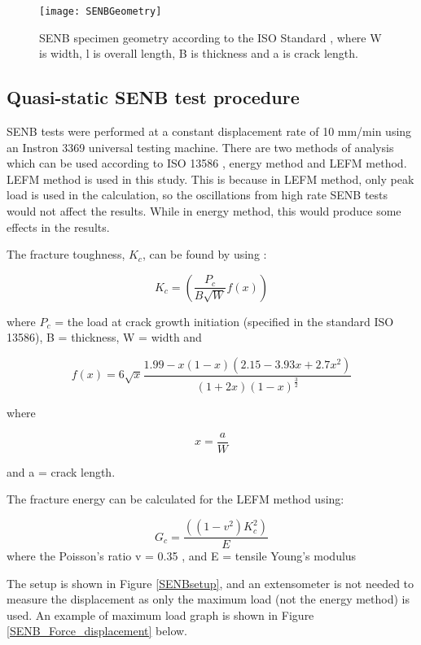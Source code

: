 \documentclass[numbers=noendperiod,chapterprefix=on]{icldt} %
\begin{document}
\begin{figure}[!hp]
\centering
\texttt{[image: SENBGeometry]}
\caption{SENB specimen geometry according to the ISO Standard \cite{ISO13586}, where W is width, l is overall length, B is thickness and a is crack length.} \label{SENBGeometry}
\end{figure}
\FloatBarrier

\subsection{Quasi-static SENB test procedure}

SENB tests were performed at a constant displacement rate of 10 mm/min using an Instron 3369 universal testing machine.
There are two methods of analysis which can be used according to ISO 13586 \cite{ISO13586}, energy method and LEFM method. LEFM method is used in this study. This is because in LEFM method,
only peak load is used in the calculation, so the oscillations from high rate SENB tests would not affect the results. While in energy method, this would produce some effects in the results.  

The fracture toughness, $K_c$, can be found by using  \cite{Chong2015,ISO13586}: 

\begin{equation} 
K_c = (\dfrac{P_c}{B \sqrt{W} }f(x))
\end{equation}

where $ P_{c} $ = the load at crack growth initiation (specified in the standard ISO 13586), B = thickness, W = width and 

\begin{equation}
f(x) = 6\sqrt{x} \dfrac{1.99-x(1-x)(2.15-3.93x+2.7x^{2})}{(1+2x)(1-x)^{\frac{3}{2}}}
\end{equation}

where 

\begin{equation}
x = \dfrac{a}{W}
\end{equation}

and a = crack length.

The fracture energy can be calculated for the LEFM method \cite{Karac2011} using:

\begin{equation} 
G_c= \frac{((1-v^2) K_c^2)}{E}
\end{equation}
where the Poisson's ratio v = 0.35 \cite{Karac2011}, and E = tensile Young's modulus

The setup is shown in Figure \ref{SENBsetup}, and an extensometer is not needed to measure the displacement as only the maximum load (not the energy method) is used. An example of maximum load graph is shown in Figure \ref{SENB_Force_displacement} below.
\end{document}
